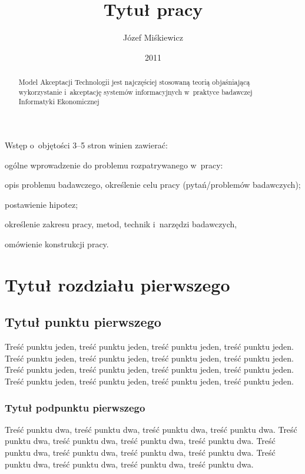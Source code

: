\documentclass[brudnopis,xodstep]{wkmgr}
\author{Józef Miśkiewicz}
\title{Tytuł pracy}
\date{2011}
\begin{document}
\nocite{beebe,p.perl} %

\begin{abstract}
Model Akceptacji Technologii jest najczęściej stosowaną teorią objaśniającą wykorzystanie
i~akceptację systemów informacyjnych w~praktyce badawczej Informatyki Ekonomicznej
\end{abstract}

\maketitle
%

\introduction

Wstęp o~objętości 3--5 stron winien zawierać: 

ogólne wprowadzenie do problemu rozpatrywanego w~pracy:

opis problemu badawczego, określenie celu pracy (pytań/problemów badawczych);

postawienie hipotez;

określenie zakresu pracy, metod, technik i~narzędzi badawczych, 

omówienie konstrukcji pracy.

\chapter{Tytuł rozdziału pierwszego}
\section{Tytuł punktu pierwszego}

Treść punktu jeden, treść punktu jeden, treść punktu jeden, treść punktu jeden.
Treść punktu jeden, treść punktu jeden, treść punktu jeden, treść punktu jeden.
Treść punktu jeden, treść punktu jeden, treść punktu jeden, treść punktu jeden.
Treść punktu jeden, treść punktu jeden, treść punktu jeden, treść punktu jeden.

\subsection{Tytuł podpunktu pierwszego}

Treść punktu dwa, treść punktu dwa, treść punktu dwa, treść punktu dwa.
Treść punktu dwa, treść punktu dwa, treść punktu dwa, treść punktu dwa.
Treść punktu dwa, treść punktu dwa, treść punktu dwa, treść punktu dwa.
Treść punktu dwa, treść punktu dwa, treść punktu dwa, treść punktu dwa.
\end{document}
